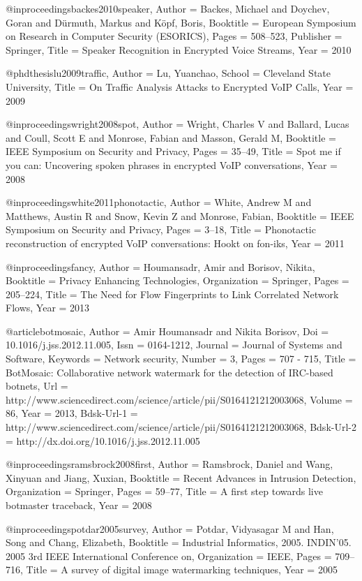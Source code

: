{{{{{	@inproceedings{backes2010speaker,
	Author = {Backes, Michael and Doychev, Goran and D{\"u}rmuth, Markus and K{\"o}pf, Boris},
	Booktitle = {{European Symposium on Research in Computer Security (ESORICS)}},
	Pages = {508--523},
	Publisher = {Springer},
	Title = {{Speaker Recognition in Encrypted Voice Streams}},
	Year = {2010}}
	
	@phdthesis{lu2009traffic,
	Author = {Lu, Yuanchao},
	School = {Cleveland State University},
	Title = {{On Traffic Analysis Attacks to Encrypted VoIP Calls}},
	Year = {2009}}
	
	@inproceedings{wright2008spot,
	Author = {Wright, Charles V and Ballard, Lucas and Coull, Scott E and Monrose, Fabian and Masson, Gerald M},
	Booktitle = {IEEE Symposium on Security and Privacy},
	Pages = {35--49},
	Title = {Spot me if you can: Uncovering spoken phrases in encrypted VoIP conversations},
	Year = {2008}}
	
	@inproceedings{white2011phonotactic,
	Author = {White, Andrew M and Matthews, Austin R and Snow, Kevin Z and Monrose, Fabian},
	Booktitle = {IEEE Symposium on Security and Privacy},
	Pages = {3--18},
	Title = {Phonotactic reconstruction of encrypted VoIP conversations: Hookt on fon-iks},
	Year = {2011}}
	
	@inproceedings{fancy,
	Author = {Houmansadr, Amir and Borisov, Nikita},
	Booktitle = {Privacy Enhancing Technologies},
	Organization = {Springer},
	Pages = {205--224},
	Title = {The Need for Flow Fingerprints to Link Correlated Network Flows},
	Year = {2013}}
	
	@article{botmosaic,
	Author = {Amir Houmansadr and Nikita Borisov},
	Doi = {10.1016/j.jss.2012.11.005},
	Issn = {0164-1212},
	Journal = {Journal of Systems and Software},
	Keywords = {Network security},
	Number = {3},
	Pages = {707 - 715},
	Title = {BotMosaic: Collaborative network watermark for the detection of IRC-based botnets},
	Url = {http://www.sciencedirect.com/science/article/pii/S0164121212003068},
	Volume = {86},
	Year = {2013},
	Bdsk-Url-1 = {http://www.sciencedirect.com/science/article/pii/S0164121212003068},
	Bdsk-Url-2 = {http://dx.doi.org/10.1016/j.jss.2012.11.005}}
	
	@inproceedings{ramsbrock2008first,
	Author = {Ramsbrock, Daniel and Wang, Xinyuan and Jiang, Xuxian},
	Booktitle = {Recent Advances in Intrusion Detection},
	Organization = {Springer},
	Pages = {59--77},
	Title = {A first step towards live botmaster traceback},
	Year = {2008}}
	
	@inproceedings{potdar2005survey,
	Author = {Potdar, Vidyasagar M and Han, Song and Chang, Elizabeth},
	Booktitle = {Industrial Informatics, 2005. INDIN'05. 2005 3rd IEEE International Conference on},
	Organization = {IEEE},
	Pages = {709--716},
	Title = {A survey of digital image watermarking techniques},
	Year = {2005}}
	
}}}}}
